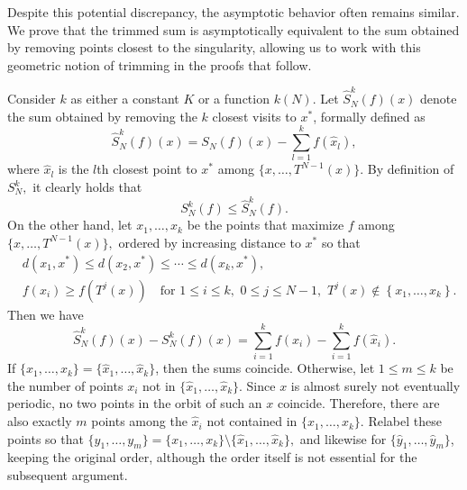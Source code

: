 \documentclass[11pt,twoside,a4paper,reqno]{amsart}
\begin{document}
Despite this potential discrepancy, the asymptotic behavior often
remains similar. We prove that the trimmed sum is
asymptotically equivalent to the sum obtained by removing points
closest to the singularity, allowing us to work with this geometric
notion of trimming in the proofs that follow.





Consider $k$ as either a constant $K$ or a function $k(N)$.
Let $\hat{S}_N^k(f)(x)$ denote the sum obtained by removing the $k$ closest visits to $x^*$, formally defined as
\begin{equation}\label{hatSdef}
\hat{S}_N^k(f)(x)=S_N(f)(x) - \sum_{l=1}^k f(\hat{x}_l),
\end{equation}
where $\hat{x}_l$ is the $l$th closest point to $x^*$ among $\{x,\ldots,T^{N-1}(x)\}$. By definition of $S_N^k,$ it clearly holds that
\begin{equation*}
S_N^k(f) \leq \hat{S}_N^k(f).
\end{equation*}
On the other hand, let $x_1,\dots,x_k$ be the points that maximize $f$ among $\{x,\ldots,T^{N-1}(x)\},$ ordered by increasing distance to $x^*$ so that
\begin{align*}
&d(x_1,x^*)\leq d(x_2,x^*) \leq \cdots \leq d(x_k, x^*),\\
& f(x_i) \geq f(T^j(x)) \quad \text{for } 1\leq i\leq k,\,\,0\leq j\leq N-1,\,\, T^j(x)\not\in \left\{x_1,\dots,x_k\right\}.
\end{align*}
Then we have
\begin{equation*}
\hat{S}_N^k(f)(x)-S_N^k(f)(x)=\sum_{i=1}^kf(x_i)-\sum_{i=1}^k f(\hat{x}_i).
\end{equation*}
If $\{x_1,\ldots,x_k\}=\{\hat{x}_1,\ldots,\hat{x}_k\}$, then the sums coincide. Otherwise, let $1\leq m\leq k$ be the number of points $x_i$ not in $\{\hat{x}_1,\ldots,\hat{x}_k\}$.
Since $x$ is almost surely not eventually periodic, no two points in the orbit of such an $x$ coincide. Therefore, there are also exactly $m$ points among the $\hat{x}_i$ not contained in $\{x_1,\ldots,x_k\}$.
Relabel these points so that $\{y_1,\ldots,y_m\}=\{x_1,\ldots,x_k\}\setminus\{\hat{x}_1,\ldots,\hat{x}_k\},$ and likewise for $\{\hat{y}_1,\ldots,\hat{y}_m\}$, keeping the original order, although the order itself is not essential for the
subsequent argument.
\end{document}
